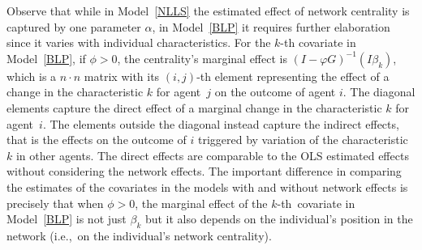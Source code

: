 \documentclass[nojss]{jss}
\begin{document}
Observe that while in Model~\ref{NLLS} the estimated effect of network
centrality is captured by one parameter $\alpha$, in Model~\ref{BLP} it
requires further elaboration since it varies with individual
characteristics.  For the $k$-th covariate in Model~\ref{BLP}, if $\phi
>0$, the centrality's marginal effect is $(I-\varphi G)^{-1}(I\beta _{k})$,
which is a $n\cdot n$ matrix with its $(i,j)$-th element representing the
effect of a change in the characteristic $k$ for agent $\,j$ on the outcome
of agent $i.$ The diagonal elements capture the direct effect of a marginal
change in the characteristic $k$ for agent $\,i.$ The elements outside the
diagonal instead capture the indirect effects, that is the effects on the
outcome of $i$ triggered by variation of the characteristic $k$ in other
agents.  The direct effects are comparable to the OLS estimated effects
without considering the network effects.  The important difference in
comparing the estimates of the covariates in the models with and without
network effects is precisely that when $\phi>0$, the marginal effect of the
$k$-th\ covariate in Model~\ref{BLP} is not just $\beta_{k}$ but it also
depends on the individual's position in the network (i.e.,~on the
individual's network centrality).
\end{document}
